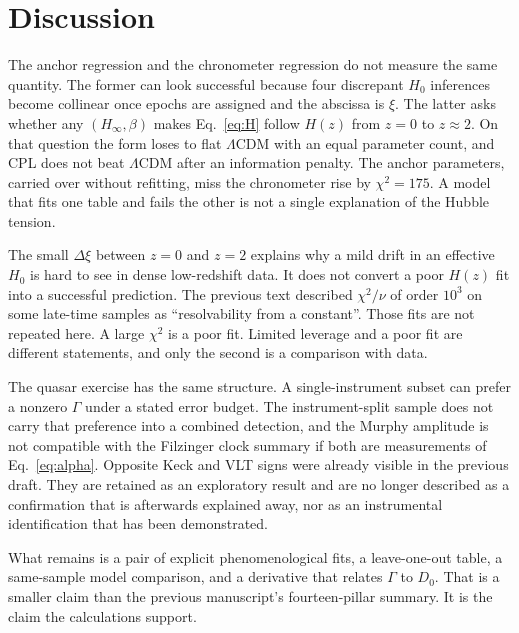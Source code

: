 \section{Discussion}
\label{sec:discussion}

The anchor regression and the chronometer regression do not measure the same quantity.
The former can look successful because four discrepant $H_{0}$ inferences become collinear once epochs are assigned and the abscissa is $\xi$.
The latter asks whether any $(H_{\infty},\beta)$ makes Eq.~\eqref{eq:H} follow $H(z)$ from $z=0$ to $z\approx2$.
On that question the form loses to flat $\Lambda$CDM with an equal parameter count, and CPL does not beat $\Lambda$CDM after an information penalty.
The anchor parameters, carried over without refitting, miss the chronometer rise by $\chi^{2}=175$.
A model that fits one table and fails the other is not a single explanation of the Hubble tension.

The small $\Delta\xi$ between $z=0$ and $z=2$ explains why a mild drift in an effective $H_{0}$ is hard to see in dense low-redshift data.
It does not convert a poor $H(z)$ fit into a successful prediction.
The previous text described $\chi^{2}/\nu$ of order $10^{3}$ on some late-time samples as ``resolvability from a constant''.
Those fits are not repeated here.
A large $\chi^{2}$ is a poor fit.
Limited leverage and a poor fit are different statements, and only the second is a comparison with data.

The quasar exercise has the same structure.
A single-instrument subset can prefer a nonzero $\Gamma$ under a stated error budget.
The instrument-split sample does not carry that preference into a combined detection, and the Murphy amplitude is not compatible with the Filzinger clock summary if both are measurements of Eq.~\eqref{eq:alpha}.
Opposite Keck and VLT signs were already visible in the previous draft.
They are retained as an exploratory result and are no longer described as a confirmation that is afterwards explained away, nor as an instrumental identification that has been demonstrated.

What remains is a pair of explicit phenomenological fits, a leave-one-out table, a same-sample model comparison, and a derivative that relates $\Gamma$ to $D_{0}$.
That is a smaller claim than the previous manuscript's fourteen-pillar summary.
It is the claim the calculations support.

